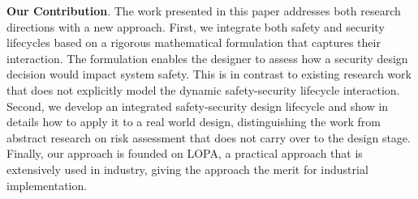 \documentclass[journal]{IEEEtran}
\begin{document}
\textbf{Our Contribution}. The work presented in this paper addresses both research directions with a new approach. First, we integrate both safety and security lifecycles based on a rigorous mathematical formulation that captures their interaction. The formulation enables the designer to assess how a security design decision would impact system safety. This is in contrast to existing research work that does not explicitly model the dynamic safety-security lifecycle interaction. Second, we develop an integrated safety-security design lifecycle and show in details how to apply it to a real world design, distinguishing the work from abstract research on risk assessment that does not carry over to the design stage. Finally, our approach is founded on LOPA,  a practical approach that is extensively used in industry, giving the approach the merit for industrial implementation.


\end{document}
